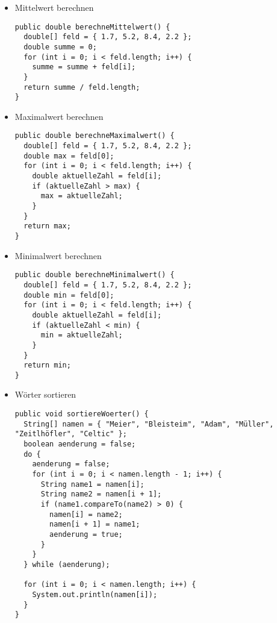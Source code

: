 \documentclass{lehramt-informatik}
\begin{document}
\begin{itemize}

%

\item Mittelwert berechnen

\begin{verbatim}
public double berechneMittelwert() {
  double[] feld = { 1.7, 5.2, 8.4, 2.2 };
  double summe = 0;
  for (int i = 0; i < feld.length; i++) {
    summe = summe + feld[i];
  }
  return summe / feld.length;
}
\end{verbatim}

%

\item Maximalwert berechnen

\begin{verbatim}
public double berechneMaximalwert() {
  double[] feld = { 1.7, 5.2, 8.4, 2.2 };
  double max = feld[0];
  for (int i = 0; i < feld.length; i++) {
    double aktuelleZahl = feld[i];
    if (aktuelleZahl > max) {
      max = aktuelleZahl;
    }
  }
  return max;
}
\end{verbatim}

%

\item Minimalwert berechnen

\begin{verbatim}
public double berechneMinimalwert() {
  double[] feld = { 1.7, 5.2, 8.4, 2.2 };
  double min = feld[0];
  for (int i = 0; i < feld.length; i++) {
    double aktuelleZahl = feld[i];
    if (aktuelleZahl < min) {
      min = aktuelleZahl;
    }
  }
  return min;
}
\end{verbatim}

%

\item Wörter sortieren

\begin{verbatim}
public void sortiereWoerter() {
  String[] namen = { "Meier", "Bleisteim", "Adam", "Müller", "Zeitlhöfler", "Celtic" };
  boolean aenderung = false;
  do {
    aenderung = false;
    for (int i = 0; i < namen.length - 1; i++) {
      String name1 = namen[i];
      String name2 = namen[i + 1];
      if (name1.compareTo(name2) > 0) {
        namen[i] = name2;
        namen[i + 1] = name1;
        aenderung = true;
      }
    }
  } while (aenderung);

  for (int i = 0; i < namen.length; i++) {
    System.out.println(namen[i]);
  }
}
\end{verbatim}


\end{itemize}
\end{document}
